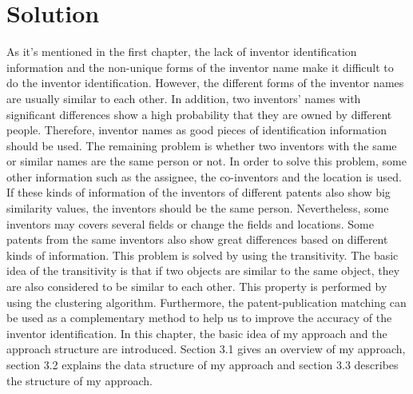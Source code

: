 \chapter{Solution}
\label{cha:solutioni}
As it's mentioned in the first chapter, the lack of inventor identification information and the non-unique forms of the inventor name make it difficult to do the inventor identification. However, the different forms of the inventor names are usually similar to each other. In addition,  two inventors' names with significant differences show a high probability that they are owned by different people. Therefore, inventor names as good pieces of identification information should be used. The remaining problem is whether two inventors with the same or similar names are the same person or not. In order to solve this problem, some other information such as the assignee, the co-inventors and the location is used. If these kinds of information of the inventors of different patents also show big similarity values, the inventors should be the same person. Nevertheless, some inventors may covers several fields or change the fields and locations. Some patents from the same inventors also show great differences based on different kinds of information.  This problem is solved by using the transitivity. The basic idea of the transitivity is that if two objects are similar to the same object, they are also considered to be similar to each other. This property is performed by using the clustering algorithm. Furthermore, the patent-publication matching can be used as a complementary method to help us to improve the accuracy of the inventor identification. In this chapter, the basic idea of my approach and the approach structure are introduced. Section 3.1 gives an overview of my approach, section 3.2 explains the data structure of my approach and section 3.3 describes the structure of my approach. 

